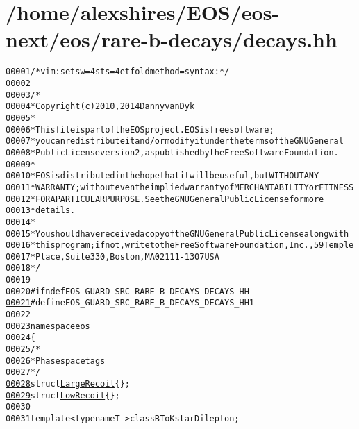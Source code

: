 \hypertarget{decays_8hh_source}{
\section{/home/alexshires/EOS/eos-\/next/eos/rare-\/b-\/decays/decays.hh}
}


\begin{footnotesize}\begin{alltt}
00001 \textcolor{comment}{/* vim: set sw=4 sts=4 et foldmethod=syntax : */}
00002 
00003 \textcolor{comment}{/*}
00004 \textcolor{comment}{ * Copyright (c) 2010, 2014 Danny van Dyk}
00005 \textcolor{comment}{ *}
00006 \textcolor{comment}{ * This file is part of the EOS project. EOS is free software;}
00007 \textcolor{comment}{ * you can redistribute it and/or modify it under the terms of the GNU General}
00008 \textcolor{comment}{ * Public License version 2, as published by the Free Software Foundation.}
00009 \textcolor{comment}{ *}
00010 \textcolor{comment}{ * EOS is distributed in the hope that it will be useful, but WITHOUT ANY}
00011 \textcolor{comment}{ * WARRANTY; without even the implied warranty of MERCHANTABILITY or FITNESS}
00012 \textcolor{comment}{ * FOR A PARTICULAR PURPOSE.  See the GNU General Public License for more}
00013 \textcolor{comment}{ * details.}
00014 \textcolor{comment}{ *}
00015 \textcolor{comment}{ * You should have received a copy of the GNU General Public License along with}
00016 \textcolor{comment}{ * this program; if not, write to the Free Software Foundation, Inc., 59 Temple}
00017 \textcolor{comment}{ * Place, Suite 330, Boston, MA  02111-1307  USA}
00018 \textcolor{comment}{ */}
00019 
00020 \textcolor{preprocessor}{#ifndef EOS\_GUARD\_SRC\_RARE\_B\_DECAYS\_DECAYS\_HH}
\hypertarget{decays_8hh_source_l00021}{}\hyperlink{decays_8hh_a94af5ab57ee3f750d538b5a4c5b577dd}{00021} \textcolor{preprocessor}{}\textcolor{preprocessor}{#define EOS\_GUARD\_SRC\_RARE\_B\_DECAYS\_DECAYS\_HH 1}
00022 \textcolor{preprocessor}{}
00023 \textcolor{keyword}{namespace }eos
00024 \{
00025     \textcolor{comment}{/*}
00026 \textcolor{comment}{     * Phase space tags}
00027 \textcolor{comment}{     */}
\hypertarget{decays_8hh_source_l00028}{}\hyperlink{structeos_1_1LargeRecoil}{00028}     \textcolor{keyword}{struct }\hyperlink{structeos_1_1LargeRecoil}{LargeRecoil} \{ \};
\hypertarget{decays_8hh_source_l00029}{}\hyperlink{structeos_1_1LowRecoil}{00029}     \textcolor{keyword}{struct }\hyperlink{structeos_1_1LowRecoil}{LowRecoil} \{ \};
00030 
00031     \textcolor{keyword}{template} <\textcolor{keyword}{typename} T\_> \textcolor{keyword}{class }BToKstarDilepton;

\end{alltt}
\end{footnotesize}
